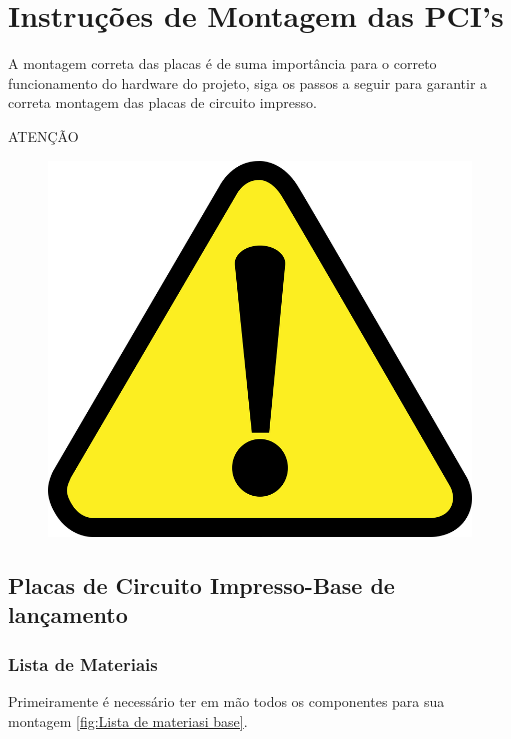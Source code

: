 \section{Instruções de Montagem das PCI's}
\par A montagem correta das placas é de suma importância para o correto funcionamento do hardware do projeto, siga os passos a seguir para garantir a correta montagem das placas de circuito impresso.
\begin{center}
ATENÇÃO
\begin{figure}[H]
  \centering
  \includegraphics[scale = 0.1]{Figuras/atenção.png}
\end{figure}
\end{center}



\subsection{Placas de Circuito Impresso-Base de lançamento}
\subsubsection{Lista de Materiais}

\par Primeiramente é necessário ter em mão todos os componentes para sua montagem \ref{fig:Lista de materiasi base}.

